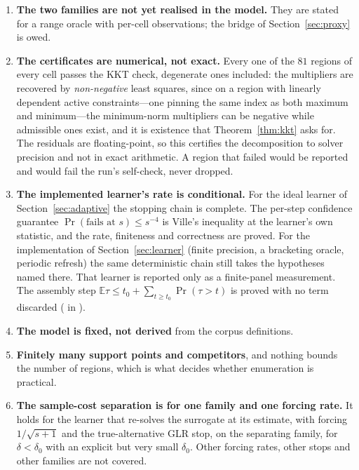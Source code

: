 \begin{enumerate}
\item[1)] \textbf{The two families are not yet realised in the model.} They are stated for a
range oracle with per-cell observations; the bridge of Section~\ref{sec:proxy} is owed.
\item[2)] \textbf{The certificates are numerical, not exact.} Every one of the $81$ regions
of every cell passes the KKT check, degenerate ones included: the multipliers are recovered
by \emph{non-negative} least squares, since on a region with linearly dependent active
constraints---one pinning the same index as both maximum and minimum---the minimum-norm
multipliers can be negative while admissible ones exist, and it is existence that
Theorem~\ref{thm:kkt} asks for. The residuals are floating-point, so this certifies
the decomposition to solver precision and not in exact arithmetic. A region that failed
would be reported and would fail the run's self-check, never dropped.
\item[3)] \textbf{The implemented learner's rate is conditional.} For the ideal learner of
Section~\ref{sec:adaptive} the stopping chain is complete. The per-step confidence guarantee
$\Pr(\text{fails at }s)\le s^{-4}$ is Ville's inequality at the learner's own statistic, and
the rate, finiteness and correctness are proved. For the implementation of
Section~\ref{sec:learner} (finite precision, a bracketing oracle, periodic refresh) the same
deterministic chain still takes the hypotheses named there. That learner is reported only as
a finite-panel measurement. The assembly step
$\mathbb{E}\tau\le t_{0}+\sum_{t\ge t_{0}}\Pr(\tau>t)$ is proved with no term discarded
( in ).
\item[4)] \textbf{The model is fixed, not derived} from the corpus definitions.
\item[5)] \textbf{Finitely many support points and competitors}, and nothing bounds the
number of regions, which is what decides whether enumeration is practical.
\item[6)] \textbf{The sample-cost separation is for one family and one forcing rate.} It
holds for the learner that re-solves the surrogate at its estimate, with forcing
$1/\sqrt{s+1}$ and the true-alternative GLR stop, on the separating family, for
$\delta<\delta_{0}$ with an explicit but very small $\delta_{0}$. Other forcing rates, other
stops and other families are not covered.
\end{enumerate}

